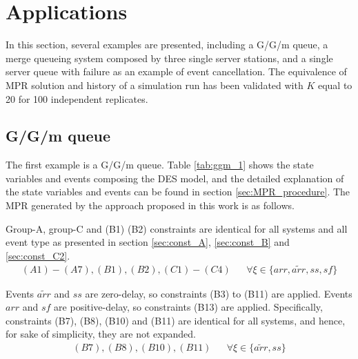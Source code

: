 \documentclass[suppldata]{interact}
\theoremstyle{plain}
\theoremstyle{definition}
\theoremstyle{remark}
\begin{document}
\section{Applications}\label{sec:app}

In this section, several examples are presented, including a G/G/m queue, a merge queueing system composed by three single server stations, and a single server queue with failure as an example of event cancellation. The equivalence of MPR solution and history of a simulation run has been validated with $K$ equal to 20 for 100 independent replicates. 

\subsection{G/G/m queue}\label{sec:ggm}
The first example is a G/G/m queue. Table \ref{tab:ggm_1} shows the state variables and events composing the DES model, and the detailed explanation of the state variables and events can be found in section \ref{sec:MPR_procedure}. The MPR generated by the approach proposed in this work is as follows.

Group-A, group-C and (B1) (B2) constraints are identical for all systems and all event type as presented in section \ref{sec:const_A},  \ref{sec:const_B} and \ref{sec:const_C2}.
\begin{eqnarray}
	(A1)-(A7),(B1),(B2),(C1)-(C4)&& \forall \xi \in\{arr,\tilde{arr},ss,sf\}\nonumber
\end{eqnarray}

Events ${\tilde{arr}}$ and ${ss}$ are zero-delay, so constraints (B3) to (B11) are applied. Events ${arr}$ and ${sf}$ are positive-delay, so constraints (B13) are applied. Specifically, constraints  (B7), (B8), (B10) and (B11) are identical for all systems, and hence, for sake of simplicity, they are not expanded. 
\begin{eqnarray}
	(B7),(B8),(B10),(B11)&& \forall \xi \in\{\tilde{arr},ss\}\nonumber
\end{eqnarray}
\end{document}

